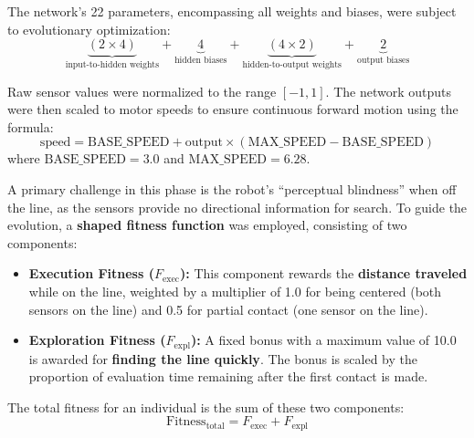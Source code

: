 \documentclass[final,5p,times,twocolumn,authoryear]{elsarticle}
\begin{document}
The network's 22 parameters, encompassing all weights and biases, were subject to evolutionary optimization:
\[
\underbrace{(2 \times 4)}_{\text{input-to-hidden weights}} + \underbrace{4}_{\text{hidden biases}} + \underbrace{(4 \times 2)}_{\text{hidden-to-output weights}} + \underbrace{2}_{\text{output biases}}
\]

Raw sensor values were normalized to the range \([-1, 1]\). The network outputs were then scaled to motor speeds to ensure continuous forward motion using the formula:
\begin{equation}
    \text{speed} = \text{BASE\_SPEED} + \text{output} \times (\text{MAX\_SPEED} - \text{BASE\_SPEED})
    \label{eq:speed_scaling}
\end{equation}
where $\text{BASE\_SPEED} = 3.0$ and $\text{MAX\_SPEED} = 6.28$.

A primary challenge in this phase is the robot's ``perceptual blindness'' when off the line, as the sensors provide no directional information for search. To guide the evolution, a \textbf{shaped fitness function} was employed, consisting of two components:
\begin{itemize}
    \item \textbf{Execution Fitness ($F_{\text{exec}}$):} This component rewards the \textbf{distance traveled} while on the line, weighted by a multiplier of 1.0 for being centered (both sensors on the line) and 0.5 for partial contact (one sensor on the line).
    
    \item \textbf{Exploration Fitness ($F_{\text{expl}}$):} A fixed bonus with a maximum value of 10.0 is awarded for \textbf{finding the line quickly}. The bonus is scaled by the proportion of evaluation time remaining after the first contact is made.
\end{itemize}

The total fitness for an individual is the sum of these two components:
\begin{equation}
    \text{Fitness}_{\text{total}} = F_{\text{exec}} + F_{\text{expl}}
    \label{eq:total_fitness}
\end{equation}
\end{document}
